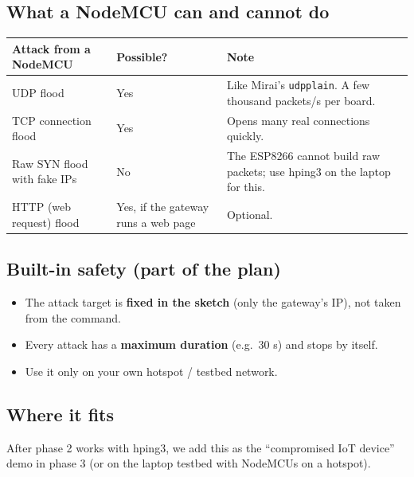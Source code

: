 \documentclass[11pt]{article}
\begin{document}
\subsection*{What a NodeMCU can and cannot do}
\begin{center}
\begin{tabular}{@{}>{\raggedright}p{4.6cm} >{\raggedright}p{3.8cm} >{\raggedright\arraybackslash}p{7.2cm}@{}}
\toprule
\textbf{Attack from a NodeMCU} & \textbf{Possible?} & \textbf{Note} \\
\midrule
UDP flood & Yes & Like Mirai's \texttt{udpplain}. A few thousand packets/s per board. \\
TCP connection flood & Yes & Opens many real connections quickly. \\
Raw SYN flood with fake IPs & No & The ESP8266 cannot build raw packets; use hping3 on the laptop for this. \\
HTTP (web request) flood & Yes, if the gateway runs a web page & Optional. \\
\bottomrule
\end{tabular}
\end{center}

\subsection*{Built-in safety (part of the plan)}
\begin{itemize}
\item The attack target is \textbf{fixed in the sketch} (only the gateway's IP), not taken from the command.
\item Every attack has a \textbf{maximum duration} (e.g.\ 30 s) and stops by itself.
\item Use it only on your own hotspot / testbed network.
\end{itemize}

\subsection*{Where it fits}
After phase 2 works with hping3, we add this as the ``compromised IoT device'' demo in phase 3 (or on the laptop testbed with NodeMCUs on a hotspot).

\end{document}
